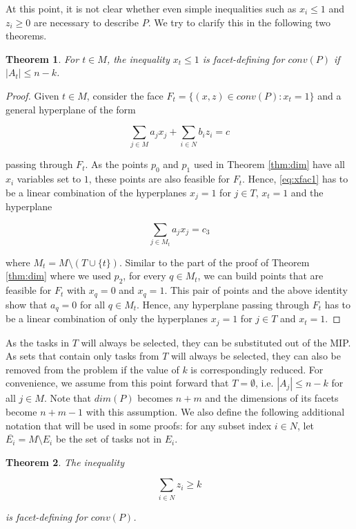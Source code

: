 \documentclass[12pt]{article}
\renewcommand{\v}[1]{\overline{#1}}
\newtheorem{thm}{Theorem}
\begin{document}
At this point, it is not clear whether even simple inequalities such as $x_i \leq 1$ and $z_i \geq 0$ are necessary to describe $P$. We try to clarify this in the following two theorems.

\begin{thm} \label{thm:xfac}
For $t \in M$, the inequality $x_t \leq 1$ is facet-defining for $conv(P)$ if $|A_t| \leq n-k$.
\end{thm}

\begin{proof}
Given $t \in M$, consider the face $F_t = \{(x,z) \in conv(P) : x_t = 1\}$ and a general hyperplane of the form

\begin{equation} \label{eq:xfac1}
\sum_{j \in M} a_j x_j + \sum_{i \in N} b_i z_i = c
\end{equation}

passing through $F_t$. As the points $p_0$ and $p_1$ used in Theorem \ref{thm:dim} have all $x_i$ variables set to $1$, these points are also feasible for $F_t$. Hence, \eqref{eq:xfac1} has to be a linear combination of the hyperplanes $x_j = 1$ for $j \in T$, $x_t=1$ and the hyperplane 

\[ \sum_{j \in M_t} a_j x_j = c_3\]

where $M_t = M \setminus (T \cup \{t\})$. Similar to the part of the proof of Theorem \ref{thm:dim} where we used $p_2$, for every $q \in M_t$, we can build points that are feasible for $F_t$ with $x_q = 0$ and $x_q = 1$. This pair of points and the above identity show that $a_q = 0$ for all $q \in M_t$. Hence, any hyperplane passing through $F_t$ has to be a linear combination of only the hyperplanes $x_j=1$ for $j \in T$ and $x_t=1$.
\end{proof}

As the tasks in $T$ will always be selected, they can be substituted out of the MIP. As sets that contain only tasks from $T$ will always be selected, they can also be removed from the problem if the value of $k$ is correspondingly reduced. For convenience, we assume from this point forward that $T = \emptyset$, i.e. $|A_j| \leq n-k$ for all $j \in M$. Note that $dim(P)$ becomes $n+m$ and the dimensions of its facets become $n+m-1$ with this assumption. We also define the following additional notation that will be used in some proofs: for any subset index $i \in N$, let $\v{E_i} = M \setminus E_i$ be the set of tasks not in $E_i$.\\

\begin{thm} \label{thm:cardfac}
The inequality

\begin{equation} \label{eq:card}
\sum_{i \in N} z_i \geq k
\end{equation}

is facet-defining for $conv(P)$.
\end{thm}
\end{document}
